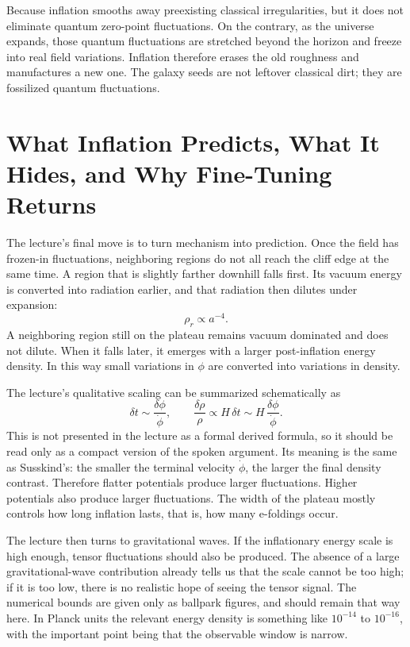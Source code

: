 Because inflation smooths away preexisting classical irregularities, but it does not eliminate quantum zero-point fluctuations. On the contrary, as the universe expands, those quantum fluctuations are stretched beyond the horizon and freeze into real field variations. Inflation therefore erases the old roughness and manufactures a new one. The galaxy seeds are not leftover classical dirt; they are fossilized quantum fluctuations.

\section{What Inflation Predicts, What It Hides, and Why Fine-Tuning Returns}

The lecture's final move is to turn mechanism into prediction. Once the field has frozen-in fluctuations, neighboring regions do not all reach the cliff edge at the same time. A region that is slightly farther downhill falls first. Its vacuum energy is converted into radiation earlier, and that radiation then dilutes under expansion:
\begin{equation}
\rho_r\propto a^{-4}.
\end{equation}
A neighboring region still on the plateau remains vacuum dominated and does not dilute. When it falls later, it emerges with a larger post-inflation energy density. In this way small variations in \(\phi\) are converted into variations in density.

The lecture's qualitative scaling can be summarized schematically as
\begin{equation}
\delta t \sim \frac{\delta\phi}{\dot\phi},
\qquad
\frac{\delta\rho}{\rho}\propto H\,\delta t
\sim H\,\frac{\delta\phi}{\dot\phi}.
\end{equation}
This is not presented in the lecture as a formal derived formula, so it should be read only as a compact version of the spoken argument. Its meaning is the same as Susskind's: the smaller the terminal velocity \(\dot\phi\), the larger the final density contrast. Therefore flatter potentials produce larger fluctuations. Higher potentials also produce larger fluctuations. The width of the plateau mostly controls how long inflation lasts, that is, how many e-foldings occur.

The lecture then turns to gravitational waves. If the inflationary energy scale is high enough, tensor fluctuations should also be produced. The absence of a large gravitational-wave contribution already tells us that the scale cannot be too high; if it is too low, there is no realistic hope of seeing the tensor signal. The numerical bounds are given only as ballpark figures, and should remain that way here. In Planck units the relevant energy density is something like \(10^{-14}\) to \(10^{-16}\), with the important point being that the observable window is narrow.

